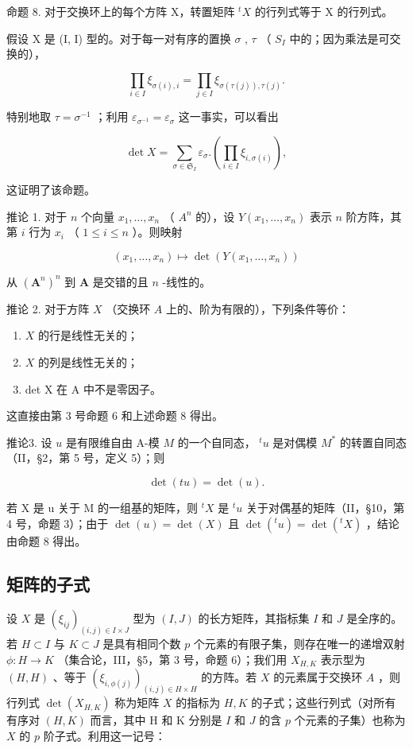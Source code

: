 命题 8. 对于交换环上的每个方阵 X，转置矩阵 \(^{t}X\) 的行列式等于 X 的行列式。

假设 X 是 (I, I) 型的。对于每一对有序的置换 \(\sigma\) , \(\tau\) （ \(S_{I}\) 中的；因为乘法是可交换的），

\[
\prod_ {i \in I} \xi_ {\sigma (i), i} = \prod_ {j \in I} \xi_ {\sigma (\tau (j)), \tau (j)}.
\]

特别地取 \(\tau = \sigma^{-1}\) ；利用 \(\varepsilon_{\sigma^{-1}} = \varepsilon_{\sigma}\) 这一事实，可以看出

\[
\det X = \sum_ {\sigma \in \mathfrak {S} _ {I}} \varepsilon_ {\sigma}. \left(\prod_ {i \in I} \xi_ {i, \sigma (i)}\right),\tag{15}
\]

这证明了该命题。

推论 1. 对于 \(n\) 个向量 \(x_1, \ldots, x_n\) （ \(A^n\) 的），设 \(Y(x_1, \ldots, x_n)\) 表示 \(n\) 阶方阵，其第 \(i\) 行为 \(x_i\) （ \(1 \leqslant i \leqslant n\) ）。则映射

\[
(x _ {1}, \dots , x _ {n}) \mapsto \det (Y (x _ {1}, \dots , x _ {n}))
\]

从 \((\mathbf{A}^n)^n\) 到 \(\mathbf{A}\) 是交错的且 \(n\) -线性的。

推论 2. 对于方阵 \(X\) （交换环 \(A\) 上的、阶为有限的），下列条件等价：

\begin{enumerate}
\def\labelenumi{(\roman{enumi})}
\item
  \(X\) 的行是线性无关的；
\item
  \(X\) 的列是线性无关的；
\item
  det X 在 A 中不是零因子。
\end{enumerate}

这直接由第 3 号命题 6 和上述命题 8 得出。

推论3. 设 \(u\) 是有限维自由 A-模 \(M\) 的一个自同态， \({}^t u\) 是对偶模 \(M^*\) 的转置自同态（II，§2，第 5 号，定义 5）；则

\[
\det (t u) = \det (u).\tag{16}
\]

若 X 是 u 关于 M 的一组基的矩阵，则 \({}^{t}X\) 是 \({}^{t}u\) 关于对偶基的矩阵（II，§10，第 4 号，命题 3）；由于 \(\det(u) = \det(X)\) 且 \(\det(^{t}u) = \det(^{t}X)\) ，结论由命题 8 得出。

\subsection{矩阵的子式}

设 \(X\) 是 \((\xi_{ij})_{(i,j)\in I\times J}\) 型为 \((I,J)\) 的长方矩阵，其指标集 \(I\) 和 \(J\) 是全序的。若 \(H\subset I\) 与 \(K\subset J\) 是具有相同个数 \(p\) 个元素的有限子集，则存在唯一的递增双射 \(\phi :H\to K\) （集合论，III，§5，第 3 号，命题 6）；我们用 \(X_{H,K}\) 表示型为 \((H,H)\) 、等于 \((\xi_{i,\phi (j)})_{(i,j)\in H\times H}\) 的方阵。若 \(X\) 的元素属于交换环 \(A\) ，则行列式 \(\det (X_{H,K})\) 称为矩阵 \(X\) 的指标为 \(H,K\) 的子式；这些行列式（对所有有序对 \((H,K)\) 而言，其中 H 和 K 分别是 \(I\) 和 \(J\) 的含 \(p\) 个元素的子集）也称为 \(X\) 的 \(p\) 阶子式。利用这一记号：

